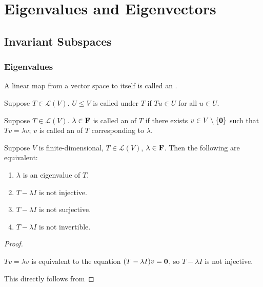 \chapter{Eigenvalues and Eigenvectors}
\section{Invariant Subspaces}
\subsection{Eigenvalues}
\begin{definition}[Operator]
A linear map from a vector space to itself is called an .
\end{definition}

\begin{definition}
Suppose $T\in\mathcal{L}(V)$. $U\le V$ is called  under $T$ if $Tu\in U$ for all $u\in U$.
\end{definition}

\begin{definition}
Suppose $T\in\mathcal{L}(V)$. $\lambda\in\mathbf F$ is called an  of $T$ if there exists $v\in V\setminus\{\vb{0}\}$ such that $Tv=\lambda v$; $v$ is called an  of $T$ corresponding to $\lambda$.
\end{definition}

\begin{lemma}
Suppose $V$ is finite-dimensional, $T\in\mathcal{L}(V)$, $\lambda\in\mathbf F$. Then the following are equivalent:
\begin{enumerate}[label=(\roman*)]
\item $\lambda$ is an eigenvalue of $T$.
\item $T-\lambda I$ is not injective.
\item $T-\lambda I$ is not surjective.
\item $T-\lambda I$ is not invertible.
\end{enumerate}
\end{lemma}

\begin{proof} \

 $Tv=\lambda v$ is equivalent to the equation $(T-\lambda I)v=\vb{0}$, so $T-\lambda I$ is not injective.

 This directly follows from 
\end{proof}

